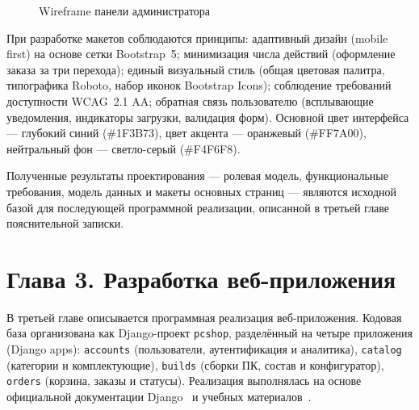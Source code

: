 \documentclass[14pt, a4paper]{extarticle}
\begin{document}
\begin{figure}[ht!]
\caption{Wireframe панели администратора}
\label{fig:wf-admin}
\end{figure}

При разработке макетов соблюдаются принципы: адаптивный дизайн (mobile first) на основе сетки Bootstrap~5; минимизация числа действий (оформление заказа за три перехода); единый визуальный стиль (общая цветовая палитра, типографика Roboto, набор иконок Bootstrap Icons); соблюдение требований доступности WCAG~2.1 AA; обратная связь пользователю (всплывающие уведомления, индикаторы загрузки, валидация форм). Основной цвет интерфейса --- глубокий синий (\#1F3B73), цвет акцента --- оранжевый (\#FF7A00), нейтральный фон --- светло-серый (\#F4F6F8).

Полученные результаты проектирования --- ролевая модель, функциональные требования, модель данных и макеты основных страниц --- являются исходной базой для последующей программной реализации, описанной в третьей главе пояснительной записки.

\section*{Глава 3. Разработка веб-приложения}

В третьей главе описывается программная реализация веб-приложения. Кодовая база организована как Django-проект \texttt{pcshop}, разделённый на четыре приложения (Django apps): \texttt{accounts} (пользователи, аутентификация и аналитика), \texttt{catalog} (категории и комплектующие), \texttt{builds} (сборки ПК, состав и конфигуратор), \texttt{orders} (корзина, заказы и статусы). Реализация выполнялась на основе официальной документации Django~\cite{django_docs} и учебных материалов~\cite{hawkins2022django}.
\end{document}
